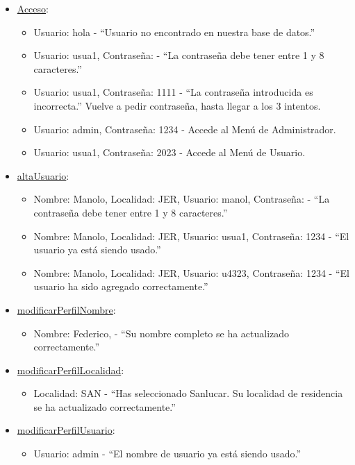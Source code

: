 \begin{itemize}
  \item \href{DOC_DOXYGEN/acceso_8c_source.html}{Acceso}:
  \begin{itemize}
    \item Usuario: hola - “Usuario no encontrado en nuestra base de datos.”
    \item Usuario: usua1, Contraseña: - “La contraseña debe tener entre 1 y 8 caracteres.”
    \item Usuario: usua1, Contraseña: 1111 - “La contraseña introducida es incorrecta.” Vuelve a pedir contraseña, hasta llegar a los 3 intentos.
    \item Usuario: admin, Contraseña: 1234 - Accede al Menú de Administrador.
    \item Usuario: usua1, Contraseña: 2023 - Accede al Menú de Usuario.
  \end{itemize}
  \item \href{DOC_DOXYGEN/escribir_8c_source.html}{altaUsuario}:
  \begin{itemize}
    \item Nombre: Manolo, Localidad: JER, Usuario: manol, Contraseña: - “La contraseña debe tener entre 1 y 8 caracteres.”
    \item Nombre: Manolo, Localidad: JER, Usuario: usua1, Contraseña: 1234 - “El usuario ya está siendo usado.”
    \item Nombre: Manolo, Localidad: JER, Usuario: u4323, Contraseña: 1234 - “El usuario ha sido agregado correctamente.”
  \end{itemize}
  \item \href{DOC_DOXYGEN/modificar_8c_source.html}{modificarPerfilNombre}:
  \begin{itemize}
    \item Nombre: Federico, - “Su nombre completo se ha actualizado correctamente.”
  \end{itemize}
  \item \href{DOC_DOXYGEN/modificar_8c_source.html}{modificarPerfilLocalidad}:
  \begin{itemize}
    \item Localidad: SAN - “Has seleccionado Sanlucar. Su localidad de residencia se ha actualizado correctamente.”
  \end{itemize}
  \item \href{DOC_DOXYGEN/modificar_8c_source.html}{modificarPerfilUsuario}:
  \begin{itemize}
    \item Usuario: admin - “El nombre de usuario ya está siendo usado.”

\end{itemize}
\end{itemize}
